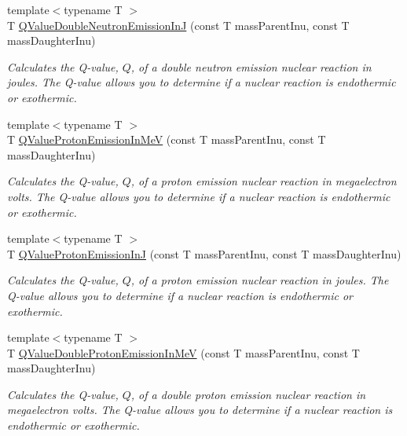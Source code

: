 \begin{DoxyCompactItemize}
{\footnotesize template$<$typename T $>$ }\\T \mbox{\hyperlink{group___e_g_x_phys-_q_value-_neutron_emission_gae8a2c7bd5c4facaea7615eccdfc47be1}{Q\+Value\+Double\+Neutron\+Emission\+InJ}} (const T mass\+Parent\+Inu, const T mass\+Daughter\+Inu)
\begin{DoxyCompactList}\small\item\em Calculates the Q-\/value, $Q$, of a double neutron emission nuclear reaction in joules. The Q-\/value allows you to determine if a nuclear reaction is endothermic or exothermic. \end{DoxyCompactList}\item 
{\footnotesize template$<$typename T $>$ }\\T \mbox{\hyperlink{group___e_g_x_phys-_q_value-_proton_emission_ga5d92756e945e66bd2ed7d55145b95c3b}{Q\+Value\+Proton\+Emission\+In\+MeV}} (const T mass\+Parent\+Inu, const T mass\+Daughter\+Inu)
\begin{DoxyCompactList}\small\item\em Calculates the Q-\/value, $Q$, of a proton emission nuclear reaction in megaelectron volts. The Q-\/value allows you to determine if a nuclear reaction is endothermic or exothermic. \end{DoxyCompactList}\item 
{\footnotesize template$<$typename T $>$ }\\T \mbox{\hyperlink{group___e_g_x_phys-_q_value-_proton_emission_ga41f19b0d9a2dc06e89de44aaa2d48d62}{Q\+Value\+Proton\+Emission\+InJ}} (const T mass\+Parent\+Inu, const T mass\+Daughter\+Inu)
\begin{DoxyCompactList}\small\item\em Calculates the Q-\/value, $Q$, of a proton emission nuclear reaction in joules. The Q-\/value allows you to determine if a nuclear reaction is endothermic or exothermic. \end{DoxyCompactList}\item 
{\footnotesize template$<$typename T $>$ }\\T \mbox{\hyperlink{group___e_g_x_phys-_q_value-_proton_emission_ga61d07711da603f2f4426fbb3f271fc34}{Q\+Value\+Double\+Proton\+Emission\+In\+MeV}} (const T mass\+Parent\+Inu, const T mass\+Daughter\+Inu)
\begin{DoxyCompactList}\small\item\em Calculates the Q-\/value, $Q$, of a double proton emission nuclear reaction in megaelectron volts. The Q-\/value allows you to determine if a nuclear reaction is endothermic or exothermic. \end{DoxyCompactList}\item 

\end{DoxyCompactItemize}
